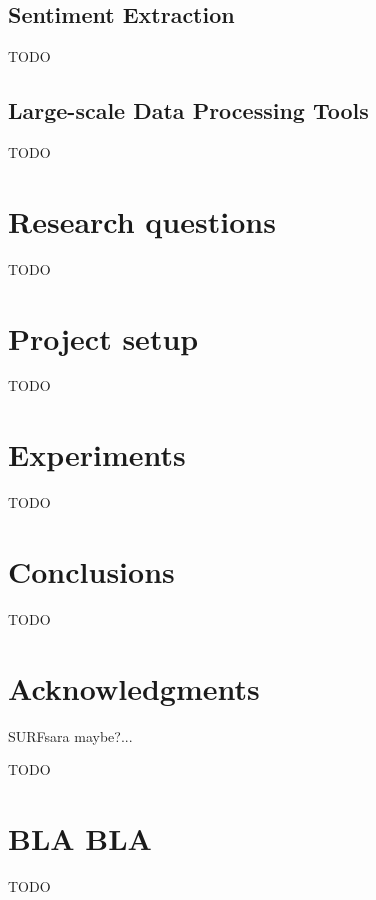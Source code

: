 \documentclass{vldb}
\begin{document}
\subsection{Sentiment Extraction}
TODO

\subsection{Large-scale Data Processing Tools}
TODO


\section{Research questions}
\label{sec:r-q}
TODO

\section{Project setup}
\label{sec:p-s}
TODO

\section{Experiments}
\label{sec:exp}
TODO

\section{Conclusions}
\label{sec:concl}
TODO

\section{Acknowledgments}
SURFsara maybe?...

\clearpage
\balance

 

\begin{appendix}
TODO

\section{BLA BLA}
TODO

\end{appendix}
\end{document}
